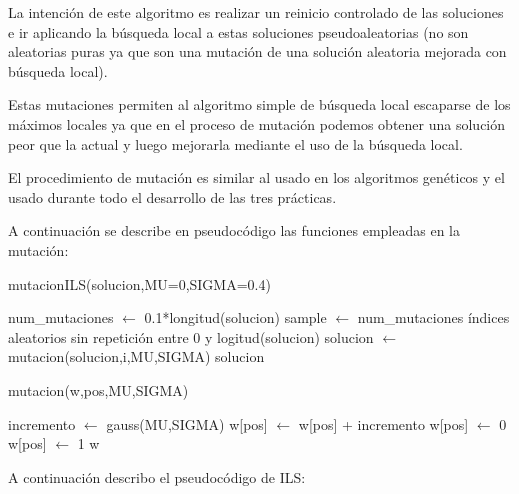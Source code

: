 \documentclass[12pt,a4paper]{article}
\begin{document}
	La intención de este algoritmo es realizar un reinicio controlado de las soluciones e ir aplicando la búsqueda local a estas soluciones pseudoaleatorias (no son aleatorias puras ya que son una mutación de una solución aleatoria mejorada con búsqueda local).
	
	Estas mutaciones permiten al algoritmo simple de búsqueda local escaparse de los máximos locales ya que en el proceso de mutación podemos obtener una solución peor que la actual y luego mejorarla mediante el uso de la búsqueda local.
	
	El procedimiento de mutación es similar al usado en los algoritmos genéticos y el usado durante todo el desarrollo de las tres prácticas.
	
	A continuación se describe en pseudocódigo las funciones empleadas en la mutación:
	
	\begin{algorithm}
		\caption{mutacionILS(solucion,MU=0,SIGMA=0.4)}
		\begin{algorithmic}
			\STATE num\_mutaciones $\leftarrow$ 0.1*longitud(solucion)
			\STATE sample $\leftarrow$ num\_mutaciones índices aleatorios sin repetición entre 0 y logitud(solucion)
				\STATE solucion $\leftarrow$ mutacion(solucion,i,MU,SIGMA)
			\ENDFOR		
			\RETURN solucion
		\end{algorithmic}
	\end{algorithm}
	
	\begin{algorithm}
		\caption{mutacion(w,pos,MU,SIGMA)}
		\begin{algorithmic}
			\STATE incremento $\leftarrow$ gauss(MU,SIGMA)
			\STATE w[pos] $\leftarrow$ w[pos] + incremento
			\IF{w[pos]$<$0}
				\STATE w[pos] $\leftarrow$ 0
			\ELSIF{w[pos]$>$1}
				\STATE w[pos] $\leftarrow$ 1
			\ENDIF
			\RETURN w
		\end{algorithmic}
	\end{algorithm}
	
	A continuación describo el pseudocódigo de ILS:
	
\end{document}
